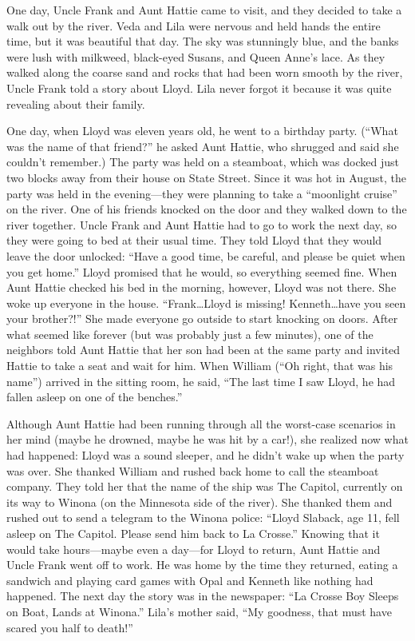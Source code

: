 \documentclass[
  letterpaper,
]{book}
\begin{document}
One day, Uncle Frank and Aunt Hattie came to visit, and they decided to
take a walk out by the river. Veda and Lila were nervous and held hands
the entire time, but it was beautiful that day. The sky was stunningly
blue, and the banks were lush with milkweed, black-eyed Susans, and
Queen Anne's lace. As they walked along the coarse sand and rocks that
had been worn smooth by the river, Uncle Frank told a story about Lloyd.
Lila never forgot it because it was quite revealing about their family.

One day, when Lloyd was eleven years old, he went to a birthday party.
(``What was the name of that friend?'' he asked Aunt Hattie, who
shrugged and said she couldn't remember.) The party was held on a
steamboat, which was docked just two blocks away from their house on
State Street. Since it was hot in August, the party was held in the
evening---they were planning to take a ``moonlight cruise'' on the
river. One of his friends knocked on the door and they walked down to
the river together. Uncle Frank and Aunt Hattie had to go to work the
next day, so they were going to bed at their usual time. They told Lloyd
that they would leave the door unlocked: ``Have a good time, be careful,
and please be quiet when you get home.'' Lloyd promised that he would,
so everything seemed fine. When Aunt Hattie checked his bed in the
morning, however, Lloyd was not there. She woke up everyone in the
house. ``Frank\ldots Lloyd is missing! Kenneth\ldots have you seen your
brother?!'' She made everyone go outside to start knocking on doors.
After what seemed like forever (but was probably just a few minutes),
one of the neighbors told Aunt Hattie that her son had been at the same
party and invited Hattie to take a seat and wait for him. When William
(``Oh right, that was his name'') arrived in the sitting room, he said,
``The last time I saw Lloyd, he had fallen asleep on one of the
benches.''

Although Aunt Hattie had been running through all the worst-case
scenarios in her mind (maybe he drowned, maybe he was hit by a car!),
she realized now what had happened: Lloyd was a sound sleeper, and he
didn't wake up when the party was over. She thanked William and rushed
back home to call the steamboat company. They told her that the name of
the ship was The Capitol, currently on its way to Winona (on the
Minnesota side of the river). She thanked them and rushed out to send a
telegram to the Winona police: ``Lloyd Slaback, age 11, fell asleep on
The Capitol. Please send him back to La Crosse.'' Knowing that it would
take hours---maybe even a day---for Lloyd to return, Aunt Hattie and
Uncle Frank went off to work. He was home by the time they returned,
eating a sandwich and playing card games with Opal and Kenneth like
nothing had happened. The next day the story was in the newspaper: ``La
Crosse Boy Sleeps on Boat, Lands at Winona.'' Lila's mother said, ``My
goodness, that must have scared you half to death!''
\end{document}

